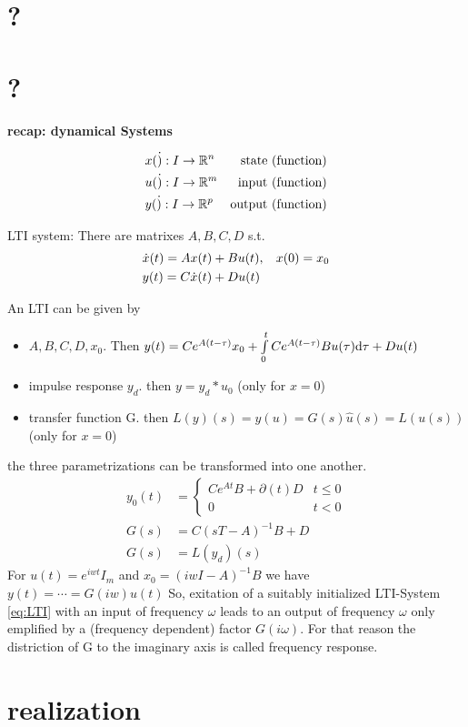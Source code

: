 \section{?}

\section{?}

\textbf{recap: dynamical Systems }

\begin{align*}
		& x(\dot ) : I \rightarrow \mathbb{R}^n & \text{state (function)}\\
		& u(\dot ) : I \rightarrow \mathbb{R}^m & \text{input (function)}\\
		& y(\dot ) : I \rightarrow \mathbb{R}^p & \text{output (function)}
\end{align*}

LTI system: There are matrixes $A,B,C,D$ s.t. 
\begin{align}
	\label{eq:LTI}
	& \dot{x}(t)=A x(t) + B u(t), \hspace{2ex} x(0)=x_0\\
	& y(t)=C \dot{x}(t) + D u(t)
\end{align}


An LTI can be given by
\begin{itemize}
	\item  $A,B,C,D, x_0$. Then $y(t)= C e^{A(t-\tau)} x_0 + \int\limits_0^t C e^{A(t-\tau)}  B u(\tau) \mathrm{d} \tau + D u(t)$\item impulse response $y_d$. then $y=y_d * u_0$ (only for $x=0$)
	\item transfer function G. then $L(y)(s)=\hat{y}(u)= G(s)\hat{u}(s)=L(u(s))$ (only for $x=0$)
\end{itemize}

the three parametrizations can be transformed into one another. 
\begin{align*}
	y_0(t) & = \left\{ \begin{array}{ll}
			C e^{At}B+ \partial (t) D & t \leq 0 \\
			0	& t<0
	\end{array} \right. \\
	G(s) & = C(sT-A)^{-1} B+D \\
	G(s) & = L(y_d)(s)
\end{align*}
For $u(t)=e^{iwt}I_m$ and $x_0=(iwI-A)^{-1}B$ we have $y(t)= \cdots = G(iw)u(t)$ 
So, exitation of a suitably initialized LTI-System \ref{eq:LTI} with an input of frequency $\omega$ leads to an output of frequency $\omega$ only emplified by a (frequency dependent) factor $G( i \omega) $. For that reason the distriction of G to the imaginary axis is called frequency response.

\section{realization} 


